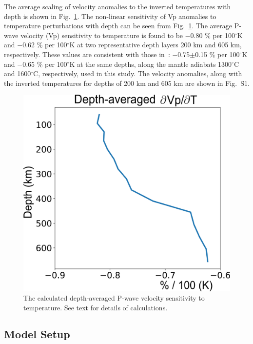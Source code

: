 \documentclass[draft,linenumbers]{agujournal2018}
\begin{document}
The average scaling of velocity anomalies to the inverted temperatures with depth is shown in Fig.~\ref{fig_temp}. The non-linear sensitivity of Vp anomalies to temperature perturbations with depth can be seen from Fig.~\ref{fig_temp}. The average P-wave velocity (Vp) sensitivity to temperature is found to be $-$0.80 \% per 100$^\circ$K and $-$0.62 \% per 100$^\circ$K at two representative depth layers 200 km and 605 km, respectively. These values are consistent with those in~\citep{Cammarano2003}: $-$0.75$\pm$0.15 \% per 100$^\circ$K and $-$0.65 \% per 100$^\circ$K at the same depths, along the mantle adiabats 1300$^{\circ}$C and 1600$^{\circ}$C, respectively, used in this study. The velocity anomalies, along with the inverted temperatures for depths of 200 km and 605 km are shown in Fig.~S1.
%
\begin{figure}[ht]
    \centering
    \includegraphics[width=0.6\linewidth]{figures/depth_average.png}
    \caption{The calculated depth-averaged P-wave velocity sensitivity to temperature. See text for details of calculations.} 
    \label{fig_temp}
 \end{figure}

\subsection{Model Setup}
    
\end{document}
